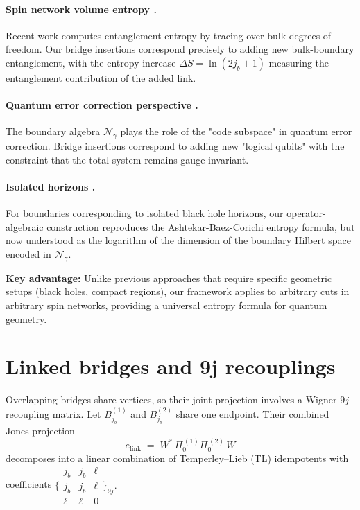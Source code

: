 \documentclass[11pt]{article}
\begin{document}
\paragraph{Spin network volume entropy \cite{BianchiDonaVilensky2019}.}
Recent work computes entanglement entropy by tracing over bulk degrees of freedom. 
Our bridge insertions correspond precisely to adding new bulk-boundary entanglement, 
with the entropy increase $\Delta S = \ln(2j_b+1)$ measuring the entanglement 
contribution of the added link.

\paragraph{Quantum error correction perspective \cite{DonnellyWall2015}.}
The boundary algebra $\mathcal{N}_\gamma$ plays the role of the "code subspace" 
in quantum error correction. Bridge insertions correspond to adding new "logical qubits" 
with the constraint that the total system remains gauge-invariant.

\paragraph{Isolated horizons \cite{AshtekarBaezCorichi1998}.}
For boundaries corresponding to isolated black hole horizons, our operator-algebraic 
construction reproduces the Ashtekar-Baez-Corichi entropy formula, but now understood 
as the logarithm of the dimension of the boundary Hilbert space encoded in $\mathcal{N}_\gamma$.

\textbf{Key advantage:} Unlike previous approaches that require specific geometric 
setups (black holes, compact regions), our framework applies to arbitrary cuts 
in arbitrary spin networks, providing a universal entropy formula for quantum geometry.

\section{Linked bridges and 9j recouplings}\label{sec:9j}

Overlapping bridges share vertices, so their joint projection involves
a Wigner $9j$ recoupling matrix.
Let $B_{j_b}^{(1)}$ and $B_{j_b}^{(2)}$ share one endpoint.
Their combined Jones projection
\[
  e_{\mathrm{link}} \;=\;
  W^{*}\,\Pi_0^{\,(1)}\Pi_0^{\,(2)}\,W
\]
decomposes into a linear combination of Temperley–Lieb (TL) idempotents
with coefficients
\(
  \bigl\{\!\!\begin{smallmatrix}j_b&j_b&\ell\\[2pt] j_b&j_b&\ell\\[2pt] \ell&\ell&0\end{smallmatrix}\!\!\bigr\}_{9j}.
\)
\end{document}
